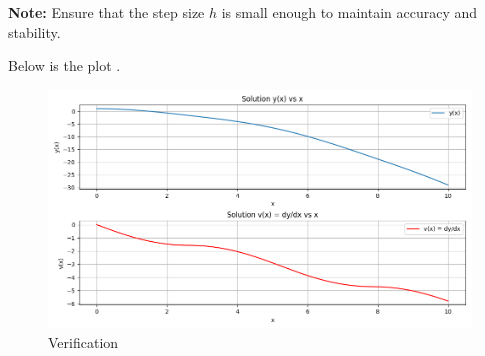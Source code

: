 \documentclass[journal]{IEEEtran}
\begin{document}
\textbf{Note:} Ensure that the step size \(h\) is small enough to maintain accuracy and stability.

Below is the plot .

\begin{figure}[h]
    \centering
    \includegraphics[width=\columnwidth]{fig/Figure_1.png}
    \caption{Verification}
    \label{fig:example}
\end{figure}
\end{document}
